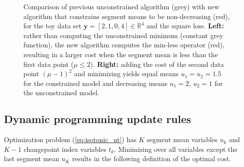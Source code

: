 \documentclass{article}
\newtheorem{lemma}{Lemma}
\newcommand{\RR}{\mathbb R}
\begin{document}
\begin{figure}[t!]
  \centering
  
  
  \vskip -0.5cm
  \caption{Comparison of previous unconstrained algorithm (grey) with
    new algorithm that constrains segment means to be non-decreasing (red),
    for the toy data set $\mathbf y= [ 2, 1, 0, 4 ] \in\RR^4$ and the
    square loss. \textbf{Left:} rather than computing the
    unconstrained minimum (constant grey function), the new algorithm
    computes the min-less operator (red), resulting in a larger cost
    when the segment mean is less than the first data point
    ($\mu\leq 2$). \textbf{Right:} adding the cost of the second data
    point $(\mu-1)^2$ and minimizing yields equal means
    $u_1=u_2=1.5$ for the constrained model and decreasing 
    means $u_1=2,\, u_2=1$ for the unconstrained model.}
  \label{fig:compare-unconstrained}
\end{figure}




\subsection{Dynamic programming update rules}
\label{sec:dyn-prog}
Optimization problem (\ref{eq:isotonic_ut}) has $K$ segment mean
variables $u_k$ and $K-1$ changepoint index variables $t_k$. Minimizing over all
variables except the last segment mean $u_K$ results in the following
definition of the optimal cost.
\end{document}
